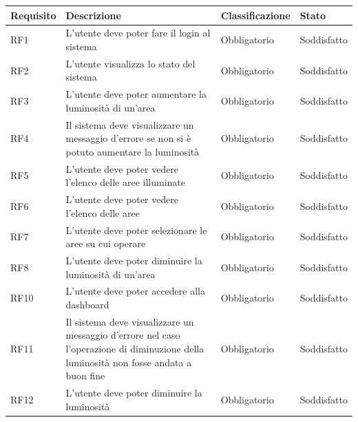 \documentclass[12pt]{article}
\begin{document}
\begin{tabular}{ |p{1.8cm}|p{5.2cm}|p{2.5cm}| p{3.5cm}| }
	\hline
	Requisito& Descrizione &Classificazione & Stato \\
	\hline
	RF1	 & L'utente deve poter fare il login al sistema & Obbligatorio & Soddisfatto \\
	\hline				
	RF2	 & L'utente visualizza lo stato del sistema & Obbligatorio & Soddisfatto \\
	\hline				
	RF3	 & L'utente deve poter aumentare la luminosità di un'area & Obbligatorio & Soddisfatto \\
	\hline				
	RF4	 & Il sistema deve visualizzare un messaggio d'errore se non si è potuto aumentare la luminosità & Obbligatorio & Soddisfatto \\
	\hline	
	RF5 & L'utente deve poter vedere l'elenco delle aree illuminate & Obbligatorio & Soddisfatto \\
	\hline
	RF6 & L'utente deve poter vedere l'elenco delle aree & Obbligatorio & Soddisfatto \\
	\hline
	RF7	 & L'utente deve poter selezionare le aree su cui operare & Obbligatorio & Soddisfatto \\
	\hline	
	RF8	 & L'utente deve poter diminuire la luminosità di un'area & Obbligatorio & Soddisfatto \\
	\hline				
	RF10	 & L'utente deve poter accedere alla dashboard & Obbligatorio & Soddisfatto \\
	\hline										
	RF11	 & Il sistema deve visualizzare un messaggio d'errore nel caso l'operazione di diminuzione della luminosità non fosse andata a buon fine & Obbligatorio & Soddisfatto \\
	\hline				
	RF12	 & L'utente deve poter diminuire la luminosità & Obbligatorio & Soddisfatto \\
	\hline				
\end{tabular}
\end{document}
